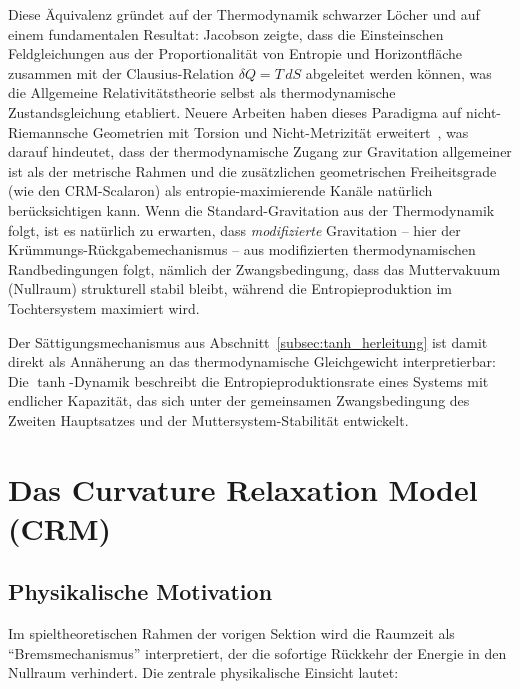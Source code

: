 \documentclass[aps,prd,twocolumn,superscriptaddress,nofootinbib]{revtex4-2}
\begin{document}
Diese \"Aquivalenz gr\"undet auf der Thermodynamik schwarzer L\"ocher \cite{Hawking1974} und auf einem fundamentalen Resultat: Jacobson \cite{Jacobson1995} zeigte, dass die Einsteinschen Feldgleichungen aus der Proportionalit\"at von Entropie und Horizontfl\"ache zusammen mit der Clausius-Relation $\delta Q = T\,dS$ abgeleitet werden k\"onnen, was die Allgemeine Relativit\"atstheorie selbst als thermodynamische Zustandsgleichung etabliert. Neuere Arbeiten haben dieses Paradigma auf nicht-Riemannsche Geometrien mit Torsion und Nicht-Metrizit\"at erweitert~\cite{JacobsonNonRiemannian2026}, was darauf hindeutet, dass der thermodynamische Zugang zur Gravitation allgemeiner ist als der metrische Rahmen und die zus\"atzlichen geometrischen Freiheitsgrade (wie den CRM-Scalaron) als entropie-maximierende Kan\"ale nat\"urlich ber\"ucksichtigen kann. Wenn die Standard-Gravitation aus der Thermodynamik folgt, ist es nat\"urlich zu erwarten, dass \textit{modifizierte} Gravitation -- hier der Kr\"ummungs-R\"uckgabemechanismus -- aus modifizierten thermodynamischen Randbedingungen folgt, n\"amlich der Zwangsbedingung, dass das Muttervakuum (Nullraum) strukturell stabil bleibt, w\"ahrend die Entropieproduktion im Tochtersystem maximiert wird.

Der S\"attigungsmechanismus aus Abschnitt~\ref{subsec:tanh_herleitung} ist damit direkt als Ann\"aherung an das thermodynamische Gleichgewicht interpretierbar: Die $\tanh$-Dynamik beschreibt die Entropieproduktionsrate eines Systems mit endlicher Kapazit\"at, das sich unter der gemeinsamen Zwangsbedingung des Zweiten Hauptsatzes und der Muttersystem-Stabilit\"at entwickelt.

\section{Das Curvature Relaxation Model (CRM)}
\label{sec:krm}

\subsection{Physikalische Motivation}
\label{subsec:motivation}

Im spieltheoretischen Rahmen der vorigen Sektion wird die Raumzeit als ``Bremsmechanismus'' interpretiert, der die sofortige R\"uckkehr der Energie in den Nullraum verhindert. Die zentrale physikalische Einsicht lautet:
\end{document}

